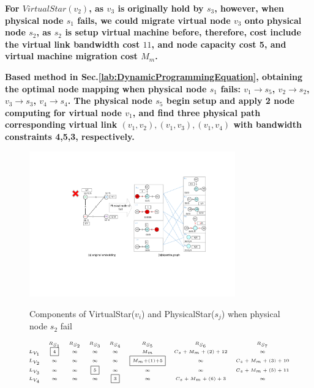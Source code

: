 
\textbf{For $VirtualStar(v_2)$, as $v_3$ is originally hold by $s_3$, however, when physical node $s_1$ fails, we could migrate virtual node $v_3$ onto physical node $s_2$, as $s_2$ is setup virtual machine before, therefore, cost include the virtual link bandwidth cost $11$, and node capacity cost 5, and virtual machine migration cost $M_m$.}

\textbf{Based method in Sec.\ref{lab:DynamicProgrammingEquation}, obtaining the optimal node mapping when physical node $s_1$ fails: $v_1 \rightarrow s_5$, $v_2 \rightarrow s_2$, $v_3 \rightarrow s_3$, $v_4 \rightarrow s_4$. The physical node $s_5$ begin setup and apply 2 node computing for virtual node $v_1$, and find three physical path corresponding virtual link $(v_1,v_2),(v_1,v_3),(v_1,v_4)$ with bandwidth constraints 4,5,3, respectively.}

\begin{figure}
\centering
\includegraphics[width=3.5in]{Fig/StarRepresentationNode2}\\
  \caption{Components of VirtualStar($v_i$) and PhysicalStar($s_j$) when physical node $s_2$ fail}\label{fig:StarRepresentationNode2}
\end{figure}

\begin{equation*}
\tiny{
 {\begin{array}{*{20}{c}}
&R_{S_{1}}&R_{S_{2}}&R_{S_3}&R_{S_4}&R_{S_5}&R_{S_6}&R_{S_{7}}\\
{L_{V_1}}&\fbox{4}&\infty&\infty&\infty&M_{m}&C_{s}+M_{m}+(2)+12&\infty\\
L_{V_2}&\infty&\infty&\infty&\infty&\fbox{$M_{m}$+(1)+5}&\infty&C_{s}+M_{m}+(3)+10\\
L_{V_3}&\infty&\infty&\fbox{5}&\infty&\infty&\infty&C_{s}+M_{m}+(5)+11\\
L_{V_4}&\infty&\infty&\infty&\fbox{3}&\infty&C_{s}+M_{m}+(6)+3&\infty\\
\end{array}}
}
\label{lab:Node2FaliureAlignmentMatrixNew}
\end{equation*}

